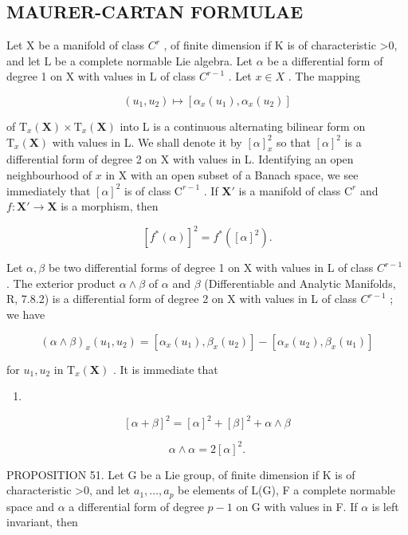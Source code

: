 \subsection{MAURER-CARTAN FORMULAE}

Let X be a manifold of class \(C^{r}\) , of finite dimension if K is of characteristic \textgreater0, and let L be a complete normable Lie algebra. Let \(\alpha\) be a differential form of degree 1 on X with values in L of class \(C^{r-1}\) . Let \(x \in X\) . The mapping

\[
(u _ {1}, u _ {2}) \mapsto [ \alpha_ {x} (u _ {1}), \alpha_ {x} (u _ {2}) ]
\]

of \(\mathrm{T}_x(\mathbf{X})\times \mathrm{T}_x(\mathbf{X})\) into L is a continuous alternating bilinear form on \(\mathrm{T}_x(\mathbf{X})\) with values in L. We shall denote it by \([\alpha ]_x^2\) so that \([\alpha ]^2\) is a differential form of degree 2 on X with values in L. Identifying an open neighbourhood of \(x\) in X with an open subset of a Banach space, we see immediately that \([\alpha ]^2\) is of class \(\mathrm{C}^{r - 1}\) . If \(\mathbf{X}'\) is a manifold of class \(\mathrm{C}^r\) and \(f\colon \mathbf{X}'\to \mathbf{X}\) is a morphism, then

\[
[ f ^ {*} (\alpha) ] ^ {2} = f ^ {*} ([ \alpha ] ^ {2}).\tag{28}
\]

Let \(\alpha, \beta\) be two differential forms of degree 1 on X with values in L of class \(C^{r-1}\) . The exterior product \(\alpha \wedge \beta\) of \(\alpha\) and \(\beta\) (Differentiable and Analytic Manifolds, R, 7.8.2) is a differential form of degree 2 on X with values in L of class \(C^{r-1}\) ; we have

\[
(\alpha \wedge \beta) _ {x} (u _ {1}, u _ {2}) = [ \alpha_ {x} (u _ {1}), \beta_ {x} (u _ {2}) ] - [ \alpha_ {x} (u _ {2}), \beta_ {x} (u _ {1}) ]\tag{29}
\]

for \(u_{1}, u_{2}\) in \(\mathrm{T}_x(\mathbf{X})\) . It is immediate that

\begin{enumerate}
\def\labelenumi{(\arabic{enumi})}
\setcounter{enumi}{29}
\tightlist
\item
\end{enumerate}

\[
[ \alpha + \beta ] ^ {2} = [ \alpha ] ^ {2} + [ \beta ] ^ {2} + \alpha \wedge \beta\tag{31}
\]

\[
\alpha \wedge \alpha = 2 [ \alpha ] ^ {2}.
\]

PROPOSITION 51. Let G be a Lie group, of finite dimension if K is of characteristic \textgreater0, and let \(a_{1},\ldots,a_{p}\) be elements of L(G), F a complete normable space and \(\alpha\) a differential form of degree \(p-1\) on G with values in F. If \(\alpha\) is left invariant, then


